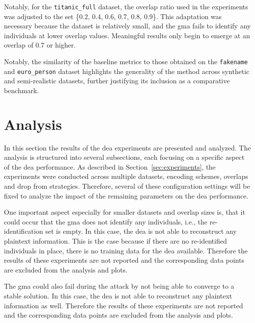 Notably, for the \texttt{titanic\_full} dataset, the overlap ratio used in the experiments was adjusted to the set \{0.2, 0.4, 0.6, 0.7, 0.8, 0.9\}.
This adaptation was necessary because the dataset is relatively small, and the \ac{gma} fails to identify any individuals at lower overlap values.
Meaningful results only begin to emerge at an overlap of 0.7 or higher.

Notably, the similarity of the baseline metrics to those obtained on the \texttt{fakename} and \texttt{euro\_person} dataset highlights the generality of the method across synthetic and semi-realistic datasets, further justifying its inclusion as a comparative benchmark.

\section{Analysis}  \label{sec:analysis}

In this section the results of the \ac{dea} experiments are presented and analyzed.
The analysis is structured into several subsections, each focusing on a specific aspect of the \ac{dea} performance.
As described in Section~\ref{sec:experiments}, the experiments were conducted across multiple datasets, encoding schemes, overlaps and drop from strategies.
Therefore, several of these configuration settings will be fixed to analyze the impact of the remaining parameters on the \ac{dea} performance.

One important aspect especially for smaller datasets and overlap sizes is, that it could occur that the \ac{gma} does not identify any individuals, i.e., the re-identification set is empty.
In this case, the \ac{dea} is not able to reconstruct any plaintext information.
This is the case because if there are no re-identified individuals in place, there is no training data for the \ac{dea} available.
Therefore the results of these experiments are not reported and the corresponding data points are excluded from the analysis and plots.

The \ac{gma} could also fail during the attack by not being able to converge to a stable solution.
In this case, the \ac{dea} is not able to reconstruct any plaintext information as well.
Therefore the results of these experiments are not reported and the corresponding data points are excluded from the analysis and plots.


